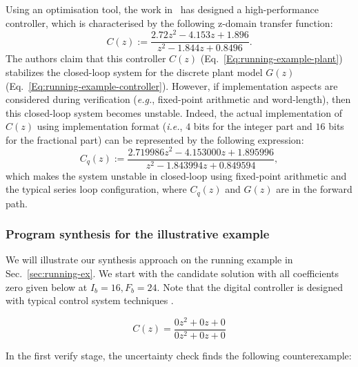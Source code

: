 \documentclass{sig-alternate-05-2015}
\newcommand{\red}[1]{{\color{red}#1}}
\begin{document}
Using an optimisation tool, the work in~\cite{DBLP:conf/hybrid/WangGRJF16}
has designed a high-performance controller, which is characterised by the
following z-domain transfer function:
%
\begin{equation}
\label{Eq:running-example-controller}
C\left(z\right) := \frac{2.72z^2 - 4.153z + 1.896}{z^2 - 1.844z + 0.8496}.
\end{equation}
%
The authors claim that this controller $C(z)$ (Eq.~\eqref{Eq:running-example-plant}) 
stabilizes the closed-loop system for the discrete plant model $G(z)$ (Eq.~\ref{Eq:running-example-controller}).  
However, if implementation aspects are considered during verification ({\it e.g.}, fixed-point
arithmetic and word-length), then this closed-loop system becomes unstable.
%
Indeed, the actual implementation of $C(z)$ using 
implementation format ({\it i.e.}, $4$ bits for the integer part and $16$
bits for the fractional part) can be represented by the following
expression:
%
\begin{equation}
\label{Eq:running-example-controller-quantized}
C_{q}\left(z\right) {:=} \frac{2.719986z^2{-}4.153000z
{+}1.895996}{z^2{-}1.843994z+0.849594},
\end{equation} 
%
which makes the system unstable in closed-loop using fixed-point arithmetic
and the typical series loop configuration, where $C_{q}\left(z\right)$ and
$G\left(z\right)$ are in the forward path.


\subsubsection{Program synthesis for the illustrative example}
We will illustrate our synthesis approach on the running example 
in Sec.~\ref{sec:running-ex}.
We start with the candidate solution with all coefficients zero 
given below at $I_b=16,F_b=24$.
Note that the digital controller is designed with typical control system
techniques \cite{Kuo:2002:ACS:579453,Ogata:1987:DCS:26170}.

$$
C(z)=\frac{0z^2{+}0z{+}0}{0z^2{+}0z{+}0}
$$

In the first {\sc verify} stage, the {\sc uncertainty} 
check finds the following counterexample:
\end{document}
